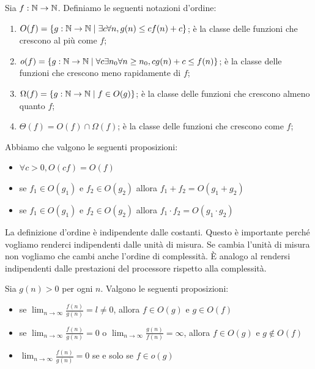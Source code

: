 \begin{defn}
    Sia $f: \mathbb{N} \to \mathbb{N}$. Definiamo le seguenti notazioni d'ordine:
    \begin{enumerate}
        \item $O(f) = \{g:\mathbb{N} \to \mathbb{N} \mid \exists c \forall n, g(n) \leq c f(n) + c\}$; è la
        classe delle funzioni che crescono al più come $f$;
        \item $o(f) = \{g:\mathbb{N} \to \mathbb{N} \mid \forall c \exists n_{0} \forall n \geq n_{0}, c g(n)
        + c \leq f(n)\}$; è la classe delle funzioni che crescono meno rapidamente di $f$;
        \item $\Omega(f) = \{g:\mathbb{N} \to \mathbb{N} \mid f \in O(g)\}$; è la classe delle funzioni che
        crescono almeno quanto $f$;
        \item $\Theta(f) = O(f) \cap \Omega(f)$; è la classe delle funzioni che crescono come $f$;
    \end{enumerate}
\end{defn}

Abbiamo che valgono le seguenti proposizioni:
\begin{itemize}
    \item $\forall c > 0, O(cf) = O(f)$ 
    \item se $f_{1} \in O(g_{1})$ e $f_{2} \in O(g_{2})$ allora $f_{1} + f_{2} = O(g_{1} + g_{2})$
    \item se $f_{1} \in O(g_{1})$ e $f_{2} \in O(g_{2})$ allora $f_{1}\cdot f_{2} = O(g_{1} \cdot g_{2})$
\end{itemize}

La definizione d'ordine è indipendente dalle costanti. Questo è importante perché vogliamo
renderci indipendenti dalle unità di misura. Se cambia l'unità di misura non vogliamo che cambi
anche l'ordine di complessità. È analogo al rendersi indipendenti dalle prestazioni del processore
rispetto alla complessità.

Sia $g(n) > 0$ per ogni $n$. Valgono le seguenti proposizioni:
\begin{itemize}
    \item se $\lim_{n \to \infty}\frac{f(n)}{g(n)} = l \not= 0$, allora $f \in O(g)$ e $g \in
    O(f)$
    \item se $\lim_{n \to \infty}\frac{f(n)}{g(n)} = 0$ o $\lim_{n \to \infty}\frac{g(n)}{f(n)} =
    \infty$, allora $f \in O(g)$ e $g \notin O(f)$
    \item $\lim_{n \to \infty}\frac{f(n)}{g(n)} = 0$ se e solo se $f \in o(g)$
\end{itemize}

